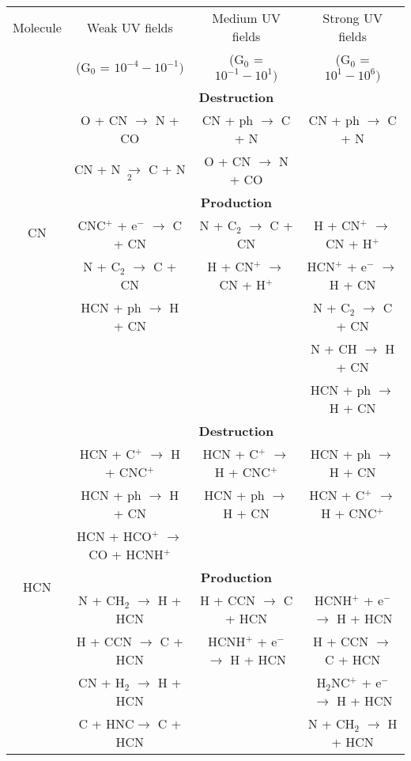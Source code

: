 \documentclass{aa}
\begin{document}
\begin{appendix}
\begin{table*}
\begin{tabular}{c c c c} \hline\hline Molecule & Weak UV fields  & Medium UV fields  & Strong UV fields  \\
& (G$_0$ = $10^{-4} - 10^{-1})$ & (G$_0$ = $10^{-1} - 10^{1})$ & (G$_0$ = $10^{1} - 10^{6})$ \\ 
\hline 
\multirow{8}{*}{CN} & \multicolumn{3}{c}{\textbf{Destruction}}\\
 &O + CN $\rightarrow$ N + CO & CN + ph $\rightarrow$ C + N & CN + ph $\rightarrow$ C + N\\
  &CN + N $\rightarrow$ C + N$_2$ & O + CN $\rightarrow$ N + CO & \\
\vspace{2.5 pt} & \multicolumn{3}{c}{\textbf{Production}}\\ 
&CNC$^+$ + e$^-$ $\rightarrow$ C + CN & N
+ C$_2$ $\rightarrow$ C + CN &  H + CN$^+$ $\rightarrow$ CN + H$^+$\\ 
&N + C$_2$ $\rightarrow$ C + CN & H + CN$^+$ $\rightarrow$ CN + H$^+$ & HCN$^+$ + e$^-$ $\rightarrow$ H + CN \\
&HCN + ph $\rightarrow$ H + CN &  & N + C$_2$ $\rightarrow$ C + CN\\
 &  &   & N + CH $\rightarrow$ H + CN\\ 
 &  &   & HCN + ph $\rightarrow$ H + CN\\ 
 \hline 
 \multirow{9}{*}{HCN} & \multicolumn{3}{c}{\textbf{Destruction}}\\ 
 &HCN + C$^+$ $\rightarrow$ H + CNC$^+$ & HCN + C$^+$ $\rightarrow$ H + CNC$^+$ &  HCN + ph $\rightarrow$ H + CN\\
 &HCN + ph $\rightarrow$ H + CN &HCN + ph $\rightarrow$ H + CN & HCN + C$^+$ $\rightarrow$ H + CNC$^+$\\
 &HCN + HCO$^+$ $\rightarrow$ CO + HCNH$^+$ &  &  \\
\vspace{2.5 pt} &\multicolumn{3}{c}{\textbf{Production}}\\
&N + CH$_2$ $\rightarrow$ H + HCN & H + CCN $\rightarrow$ C + HCN & HCNH$^+$ + e$^-$ $\rightarrow$ H + HCN\\
&H + CCN $\rightarrow$ C + HCN & HCNH$^+$ + e$^-$ $\rightarrow$ H + HCN & H + CCN $\rightarrow$ C +
HCN\\ &CN + H$_2$ $\rightarrow$ H + HCN & & H$_2$NC$^+$ + e$^-$ $\rightarrow$ H + HCN 
\\ &C + HNC$\rightarrow$ C + HCN & & N + CH$_2$ $\rightarrow$ H + HCN \\ 
\hline 
\end{tabular} 
\end{table*}



\end{appendix}
\end{document}
